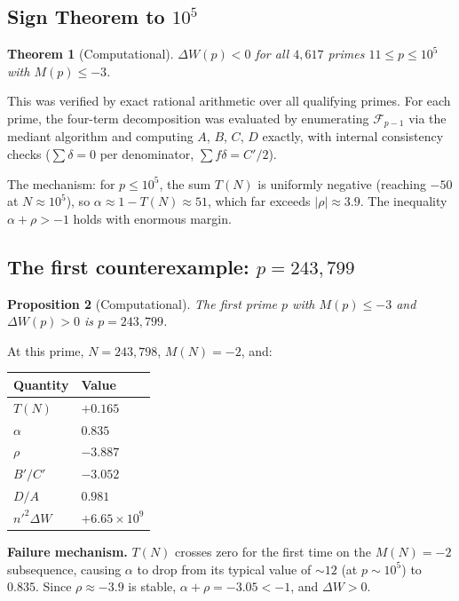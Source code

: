 \documentclass[11pt]{article}
\newtheorem{theorem}{Theorem}[section]
\newtheorem{proposition}[theorem]{Proposition}
\theoremstyle{definition}
\newcommand{\F}{\mathcal{F}}
\begin{document}
\subsection{Sign Theorem to $10^5$}

\begin{theorem}[Computational]\label{thm:sign}
$\Delta W(p) < 0$ for all $4{,}617$ primes $11 \le p \le 10^5$ with
$M(p) \le -3$.
\end{theorem}

This was verified by exact rational arithmetic over all qualifying
primes.  For each prime, the four-term decomposition was evaluated
by enumerating $\F_{p-1}$ via the mediant algorithm and computing
$A$, $B$, $C$, $D$ exactly, with internal consistency checks
($\sum \delta = 0$ per denominator, $\sum f\delta = C'/2$).

The mechanism: for $p \le 10^5$, the sum $T(N)$ is uniformly negative
(reaching $-50$ at $N \approx 10^5$), so $\alpha \approx 1 - T(N) \approx 51$,
which far exceeds $|\rho| \approx 3.9$.  The inequality
$\alpha + \rho > -1$ holds with enormous margin.

\subsection{The first counterexample: $p = 243{,}799$}

\begin{proposition}[Computational]\label{prop:counterexample}
The first prime $p$ with $M(p) \le -3$ and $\Delta W(p) > 0$ is
$p = 243{,}799$.
\end{proposition}

At this prime, $N = 243{,}798$, $M(N) = -2$, and:

\begin{center}
\begin{tabular}{ll}
\toprule
Quantity & Value \\
\midrule
$T(N)$ & $+0.165$ \\
$\alpha$ & $0.835$ \\
$\rho$ & $-3.887$ \\
$B'/C'$ & $-3.052$ \\
$D/A$ & $0.981$ \\
$n'^2 \Delta W$ & $+6.65 \times 10^9$ \\
\bottomrule
\end{tabular}
\end{center}

\textbf{Failure mechanism.}  $T(N)$ crosses zero for the first time on
the $M(N) = -2$ subsequence, causing $\alpha$ to drop from its typical
value of $\sim 12$ (at $p \sim 10^5$) to~$0.835$.  Since
$\rho \approx -3.9$ is stable, $\alpha + \rho = -3.05 < -1$, and
$\Delta W > 0$.
\end{document}
